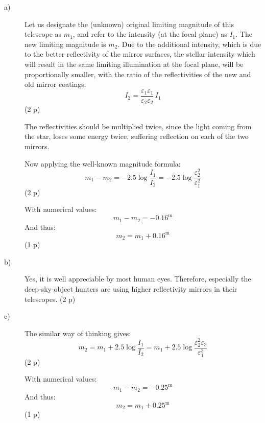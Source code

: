 \begin{description}
\item[a)] Let us designate the (unknown) original limiting magnitude of this
telescope as $m_1$, and refer to the intensity (at the focal plane) as $I_1$.
The new limiting magnitude is $m_2$. Due to the additional intensity, which
is due to the better reflectivity of the mirror surfaces, the stellar
intensity which will result in the same limiting illumination at the focal
plane, will be proportionally smaller, with the ratio of the reflectivities
of the new and old mirror coatings:
\begin{equation*}
I_2 = \frac{\varepsilon_1\varepsilon_1}{\varepsilon_2\varepsilon_2}\,I_1
\tag{4.1}
\end{equation*}
\hfill(2 p)

The reflectivities should be multiplied twice, since the light coming from
the star, loses some energy twice, suffering reflection on each of the two
mirrors.

Now applying the well-known magnitude formula:
\begin{equation*}
m_1 - m_2 = -2.5\log\frac{I_1}{I_2}
          = -2.5\log\frac{\varepsilon_2^2}{\varepsilon_1^2}
\tag{4.2}
\end{equation*}
\hfill(2 p)

With numerical values:
\[ m_1 - m_2 = -0.16^{\mathrm{m}} \]
And thus:
\[ m_2 = m_1 + 0.16^{\mathrm{m}} \]
\hfill(1 p)

\item[b)] Yes, it is well appreciable by most human eyes. Therefore,
especially the deep-sky-object hunters are using higher reflectivity mirrors
in their telescopes. \hfill(2 p)

\item[c)] The similar way of thinking gives:
\begin{equation*}
m_2 = m_1 + 2.5\log\frac{I_1}{I_2}
    = m_1 + 2.5\log\frac{\varepsilon_2^2\varepsilon_3}{\varepsilon_1^3}
\tag{4.3}
\end{equation*}
\hfill(2 p)

With numerical values:
\[ m_1 - m_2 = -0.25^{\mathrm{m}} \]
And thus:
\[ m_2 = m_1 + 0.25^{\mathrm{m}} \]
\hfill(1 p)
\end{description}
